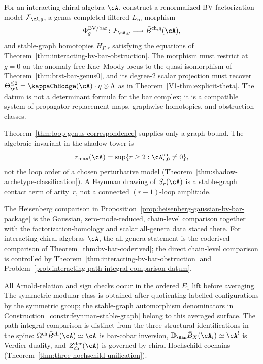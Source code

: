 \begin{problem}
\label{prob:interacting-path-integral-comparison-datum}
For an interacting chiral algebra $\cA$, construct a renormalized
BV factorization model $\mathcal{F}_{\cA,g}$, a genus-completed
filtered $L_\infty$ morphism
\[
\Phi_g^{\mathrm{BV/bar}}\colon
\mathcal{F}_{\cA,g}\longrightarrow \bar{B}^{\mathrm{ch},g}(\cA),
\]
and stable-graph homotopies $H_{\Gamma,r}$ satisfying the equations
of Theorem~\ref{thm:interacting-bv-bar-obstruction}.  The morphism
must restrict at $g=0$ on the anomaly-free Kac--Moody locus to the
quasi-isomorphism of Theorem~\ref{thm:brst-bar-genus0}, and its
degree-$2$ scalar projection must recover
$\Theta_\cA^{\leq 2}=\kappaChHodge(\cA)\cdot\eta\otimes\Lambda$ as in
Theorem~\ref{V1-thm:explicit-theta}.  The datum is not a determinant
formula for the bar complex; it is a compatible system of
propagator replacement maps, graphwise homotopies, and obstruction
classes.
\end{problem}

\begin{remark}
\label{rem:feynman-depth-decomposition}
Theorem~\ref{thm:loop-genus-correspondence} supplies only a graph
bound.  The algebraic invariant in the shadow tower is
\[
r_{\max}(\cA)=\sup\{r\geq 2:\cA^{\mathrm{sh}}_{r,0}\neq 0\},
\]
not the loop order of a chosen perturbative model
(Theorem~\ref{thm:shadow-archetype-classification}).  A Feynman
drawing of $S_r(\cA)$ is a stable-graph contact term of arity~$r$,
not a connected $(r-1)$-loop amplitude.
\end{remark}

\begin{remark}
\label{rem:bar-path-integral-scope}
The Heisenberg comparison in
Proposition~\ref{prop:heisenberg-gaussian-bv-bar-package} is the
Gaussian, zero-mode-reduced, chain-level comparison together with the
factorization-homology and scalar all-genera data stated there.  For
interacting chiral algebras $\cA$, the all-genera statement is the
coderived comparison of Theorem~\ref{thm:bv-bar-coderived};
the direct chain-level comparison is controlled by
Theorem~\ref{thm:interacting-bv-bar-obstruction} and
Problem~\ref{prob:interacting-path-integral-comparison-datum}.

All Arnold-relation and sign checks occur in the ordered $E_1$ lift
before averaging.  The symmetric modular class is obtained after
quotienting labelled configurations by the symmetric group; the
stable-graph automorphism denominators in
Construction~\ref{constr:feynman-stable-graph} belong to this averaged
surface.  The path-integral comparison is distinct from the three
structural identifications in the spine:
$\Omega^{\mathrm{ch}}\bar{B}^{\mathrm{ch}}(\cA)\simeq\cA$ is
bar-cobar inversion, $\mathbb{D}_{\Ran}\bar{B}_X(\cA_i)\simeq\cA^!$
is Verdier duality, and $Z^{\mathrm{der}}_{\mathrm{ch}}(\cA)$ is
governed by chiral Hochschild cochains
(Theorem~\ref{thm:three-hochschild-unification}).
\end{remark}
